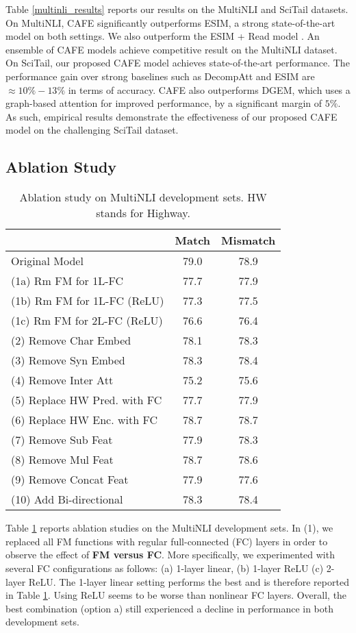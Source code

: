 \documentclass[11pt,a4paper]{article}
\begin{document}
Table \ref{multinli_results} reports our results on the MultiNLI and SciTail datasets. On MultiNLI, CAFE significantly outperforms ESIM, a strong state-of-the-art model on both settings. We also outperform the ESIM + Read model \cite{DBLP:journals/corr/Weissenborn17}. An ensemble of CAFE models achieve competitive result on the MultiNLI dataset. On SciTail, our proposed CAFE model achieves state-of-the-art performance. The performance gain over strong baselines such as DecompAtt and ESIM are $\approx 10\%-13\%$ in terms of accuracy. CAFE also outperforms DGEM, which uses a graph-based attention for improved performance, by a significant margin of $5\%$. As such, empirical results demonstrate the effectiveness of our proposed CAFE model on the challenging SciTail dataset.




\subsection{Ablation Study}
\begin{table}[htbp]
  \centering
  \small

    \begin{tabular}{|p{4cm}|cc|}
    \hline
          & \multicolumn{1}{l}{Match} & \multicolumn{1}{l|}{Mismatch} \\
          \hline
    Original Model & 79.0    & 78.9 \\
    \hline
    (1a) Rm FM for 1L-FC & 77.7  & 77.9 \\
(1b) Rm FM for 1L-FC (ReLU) & 77.3  & 77.5 \\
    (1c) Rm FM for 2L-FC (ReLU) & 76.6  & 76.4 \\
    \hline
    (2) Remove Char Embed & 78.1  & 78.3 \\
        (3) Remove Syn Embed & 78.3  & 78.4 \\
    (4) Remove Inter Att & 75.2  & 75.6 \\
(5) Replace HW Pred. with FC & 77.7  & 77.9 \\
    (6) Replace HW Enc. with FC & 78.7  & 78.7 \\
    (7) Remove Sub Feat & 77.9  & 78.3 \\
    (8) Remove Mul Feat & 78.7  & 78.6 \\
    (9) Remove Concat Feat & 77.9  & 77.6 \\
    (10) Add Bi-directional & 78.3  & 78.4 \\
    \hline
    \end{tabular}\caption{Ablation study on MultiNLI development sets. HW stands for Highway.}
  \label{tab:ablation}\end{table}Table \ref{tab:ablation} reports ablation studies on the MultiNLI development sets. In (1), we replaced all FM functions with regular full-connected (FC) layers in order to observe the effect of \textbf{FM versus FC}. More specifically, we experimented with several FC configurations as follows: (a) 1-layer linear, (b) 1-layer ReLU (c) 2-layer ReLU. The 1-layer linear setting performs the best and is therefore reported in Table \ref{tab:ablation}. Using ReLU seems to be worse than nonlinear FC layers. Overall, the best combination (option a) still experienced a decline in performance in both development sets.
\end{document}

